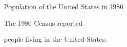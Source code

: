 \beginsection
Population of the United States in 1980

The 1980 Census reported

people living in the United States.

\bye
